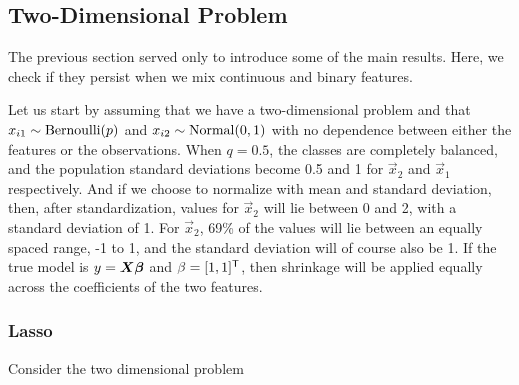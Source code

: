 
\subsection{Two-Dimensional Problem}

The previous section served only to introduce some of the main results. Here, we check if they persist when we mix continuous and binary features.

Let us start by assuming that we have a two-dimensional problem and that \(x_{i1} \sim \operatorname{Bernoulli}(p)\) and \(x_{i2} \sim \operatorname{Normal}(0, 1)\) with no dependence between either the features or the observations. When \(q = 0.5\), the classes are completely balanced, and the population standard deviations become 0.5 and 1 for \(\vec{x}_2\) and \(\vec{x}_1\) respectively. And if we choose to normalize with mean and standard deviation, then, after standardization, values for \(\vec{x}_2\) will lie between 0 and 2, with a standard deviation of 1. For \(\vec{x}_2\), 69\% of the values will lie between an equally spaced range, -1 to 1, and the standard deviation will of course also be 1. If the true model is \(y = \boldsymbol{X}\boldsymbol{\beta}\) and \(\beta = [1,1]^{\mathsf{T}}\), then shrinkage will be applied equally across the coefficients of the two features.

\subsubsection{Lasso}
Consider the two dimensional problem

